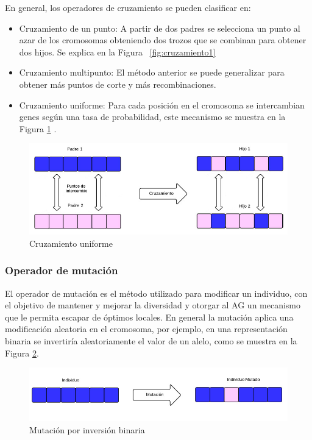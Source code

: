 En general, los operadores de cruzamiento se pueden clasificar en:

\begin{itemize}
	\item Cruzamiento de un punto: A partir de dos padres se selecciona un punto al azar de los cromosomas obteniendo dos trozos que se combinan para obtener dos hijos. Se explica en la Figura ~\ref{fig:cruzamiento1}
	\item Cruzamiento multipunto: El método anterior se puede generalizar para obtener más puntos de corte y más recombinaciones.
	\item Cruzamiento uniforme: Para cada posición en el cromosoma se   intercambian genes según una tasa de probabilidad, este mecanismo se muestra en la Figura \ref{fig:cruzamiento_uniforme} .	
\end{itemize}



\begin{figure}[ht]
	\centering
	\includegraphics[width=\textwidth]{Figures/cruzamiento_uniforme}
	\caption{Cruzamiento uniforme}
	\label{fig:cruzamiento_uniforme}
\end{figure}

\subsubsection{Operador de mutación} 
El operador de mutación es el método utilizado para modificar un individuo, con el objetivo de mantener y mejorar la diversidad y otorgar al AG un mecanismo que le permita escapar de óptimos locales. En general la mutación aplica una modificación aleatoria en el cromosoma, por ejemplo, en una representación binaria se invertiría aleatoriamente el valor de un alelo, como se muestra en la Figura \ref{fig:mutacion1}.
\begin{figure}[ht]
	\centering
	\includegraphics[width=1\linewidth]{Figures/mutacion1}
	\caption{Mutación por inversión binaria}
	\label{fig:mutacion1}
\end{figure}


